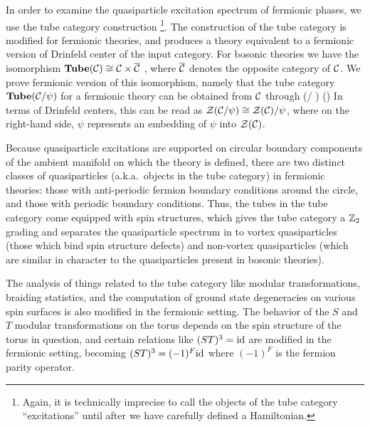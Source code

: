 In order to examine the quasiparticle excitation spectrum of fermionic phases, 
we use the tube category construction \cite{ocneanu1994}\footnote{Again, it is technically imprecise to call the objects 
of the tube category ``excitations'' until after we have carefully defined a Hamiltonian.}.
The construction of the tube category is modified for fermionic theories, and produces a theory
equivalent to a fermionic version of Drinfeld center of the input category.
For bosonic theories we have the isomorphism $\textbf{Tube}(\mathcal{C})\cong\mathcal{C}\times\overline{\mathcal{C}}$ \cite{muger2003b}, where $\overline{\mathcal{C}}$ denotes the opposite category of $\mathcal{C}$. 
We prove fermionic version of this isomorphism, namely 
that the tube category $\textbf{Tube}(\mathcal{C}/\psi)$ for a fermionic theory can be obtained from $\mathcal{C}$ through
\be 
	\tube(\mcc / \psi) \cong \mcc \times (\overline{\mcc / \psi})
\ee
In terms of Drinfeld centers, this can be read as $\mathcal{Z}(\mathcal{C} / \psi)\cong \mathcal{Z}(\mathcal{C})/\psi$, where on the right-hand side, 
$\psi$ represents an embedding of $\psi$ into $\mathcal{Z}(\mathcal{C})$.


Because quasiparticle excitations are supported on circular boundary components of the ambient 
manifold on which the theory is defined, there are two distinct classes of quasiparticles (a.k.a.\ objects in the tube category) in 
fermionic theories: those with anti-periodic fermion boundary conditions around the circle, and 
those with periodic boundary conditions. 
Thus, the tubes in the tube category come equipped with spin structures, which gives the tube category a $\mathbb{Z}_2$ grading
and separates the quasiparticle spectrum in to vortex quasiparticles (those which bind spin structure defects) 
and non-vortex quasiparticles (which are similar in character to the quasiparticles present in bosonic theories). 

The analysis of things related to the tube category like modular transformations, braiding statistics, and the computation of ground state degeneracies on various spin surfaces
is also modified in the fermionic setting.  
The behavior of the $S$ and $T$ modular transformations on the torus depends on the spin structure of the torus in question, and 
certain relations like $(ST)^3 = \text{id}$ are modified in the fermionic setting, becoming 
$(ST)^3=(-1)^F\text{id}$ where $(-1)^F$ is the fermion parity operator.

